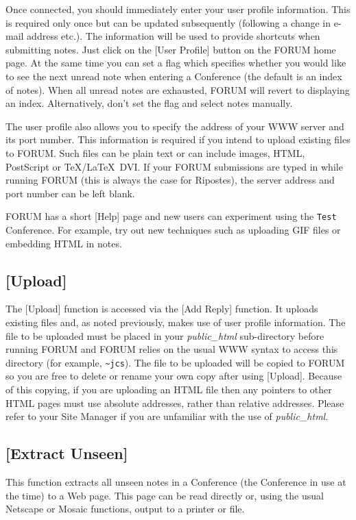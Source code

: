 \documentclass[twoside,11pt,nolof,noabs]{starlink}
\begin{document}
Once connected, you should immediately enter your user profile
information. This is required only once but can be updated subsequently
(following a change in e-mail address etc.). The information will be
used to provide shortcuts when submitting notes.  Just click on the
[User Profile] button on the FORUM home page.  At the same time you can
set a flag which specifies whether you would like to see the next
unread note when entering a Conference (the default is an index of
notes).  When all unread notes are exhausted, FORUM will revert to
displaying an index.  Alternatively, don't set the flag and select
notes manually.

The user profile also allows you to specify the address of your WWW
server and its port number.  This information is required if you intend
to   upload  existing files to FORUM.  Such files can be plain text or
can include images, HTML, PostScript or \TeX/\LaTeX~DVI.  If your FORUM
submissions are typed in while running FORUM (this is always the case
for Ripostes), the server address and port number can be left blank.

FORUM has a short [Help] page and new users can experiment using the
\texttt{Test} Conference.  For example, try out new techniques such as
uploading GIF files or embedding HTML in notes.

\subsection{[Upload]}

The [Upload] function is accessed via the [Add Reply] function.  It
uploads existing files and, as noted previously, makes use of user
profile information.   The file to be uploaded must be placed in your
\emph{public\_html} sub-directory before running FORUM and FORUM relies
on the usual WWW syntax to access this directory (for example,
\verb+~jcs+).   The file to be uploaded will be copied to FORUM so you
are free to delete or rename your own copy after using [Upload].
Because of this copying, if you are uploading an HTML file then any
pointers to other HTML pages must use absolute addresses, rather than
relative addresses.  Please refer to your Site Manager if you are
unfamiliar with the use of \emph{public\_html}.

\subsection{[Extract Unseen]} This function extracts all unseen notes
in a Conference (the Conference in use at the time) to a Web page.
This page can be read directly or, using the usual Netscape or Mosaic
functions, output to a printer or file.
\end{document}
